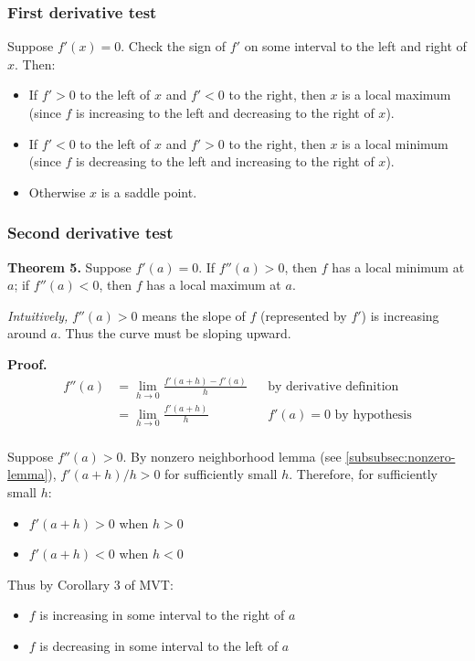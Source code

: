 \subsubsection*{First derivative test}

Suppose $f'(x)=0$. Check the sign of $f'$ on some interval to the
left and right of $x$. Then:
\begin{itemize}
\item If $f'>0$ to the left of $x$ and $f'<0$ to the right, then $x$
  is a local maximum (since $f$ is increasing to the left and
  decreasing to the right of $x$).
\item If $f'<0$ to the left of $x$ and $f'>0$ to the right, then $x$
  is a local minimum (since $f$ is decreasing to the left and
  increasing to the right of $x$).
\item Otherwise $x$ is a saddle point.
\end{itemize}

\subsubsection*{Second derivative test}

\textbf{Theorem 5.} Suppose $f'(a)=0$. If $f''(a)>0$, then $f$ has a
local minimum at $a$; if $f''(a)<0$, then $f$ has a local maximum at
$a$.

\vs

\textit{Intuitively,} $f''(a)>0$ means the slope of $f$ (represented
by $f'$) is increasing around $a$. Thus the curve must be sloping
upward.

\vs

\textbf{Proof.}
\begin{align*}
  f''(a)&=\lim_{h\to0}\frac{f'(a+h)-f'(a)}{h}&&\text{by derivative definition}\\
        &=\lim_{h\to0}\frac{f'(a+h)}{h}&&\text{$f'(a)=0$ by hypothesis}\\
\end{align*}

Suppose $f''(a)>0$. By nonzero neighborhood lemma (see
\ref{subsubsec:nonzero-lemma}), $f'(a+h)/h>0$ for sufficiently small
$h$. Therefore, for sufficiently small $h$:
\begin{itemize}
\item $f'(a+h)>0$ when $h>0$
\item $f'(a+h)<0$ when $h<0$
\end{itemize}

Thus by Corollary 3 of MVT:
\begin{itemize}
\item $f$ is increasing in some interval to the right of $a$
\item $f$ is decreasing in some interval to the left of $a$
\end{itemize}

